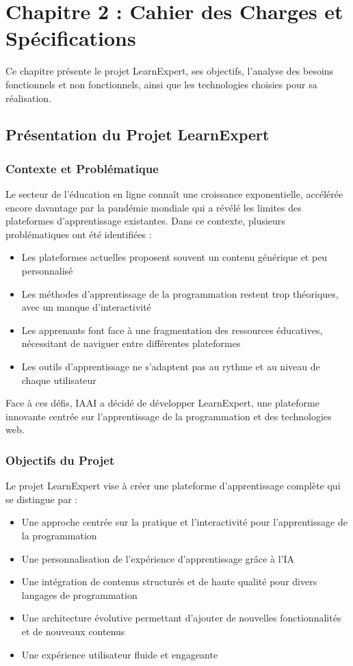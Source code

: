 \chapter{Chapitre 2 : Cahier des Charges et Spécifications}
\thispagestyle{fancy}
\newpage

Ce chapitre présente le projet LearnExpert, ses objectifs, l'analyse des besoins fonctionnels et non fonctionnels, ainsi que les technologies choisies pour sa réalisation.

\section{Présentation du Projet LearnExpert}

\subsection{Contexte et Problématique}
Le secteur de l'éducation en ligne connaît une croissance exponentielle, accélérée encore davantage par la pandémie mondiale qui a révélé les limites des plateformes d'apprentissage existantes. Dans ce contexte, plusieurs problématiques ont été identifiées :

\begin{itemize}
  \item Les plateformes actuelles proposent souvent un contenu générique et peu personnalisé
  \item Les méthodes d'apprentissage de la programmation restent trop théoriques, avec un manque d'interactivité
  \item Les apprenants font face à une fragmentation des ressources éducatives, nécessitant de naviguer entre différentes plateformes
  \item Les outils d'apprentissage ne s'adaptent pas au rythme et au niveau de chaque utilisateur
\end{itemize}

Face à ces défis, IAAI a décidé de développer LearnExpert, une plateforme innovante centrée sur l'apprentissage de la programmation et des technologies web.

\subsection{Objectifs du Projet}
Le projet LearnExpert vise à créer une plateforme d'apprentissage complète qui se distingue par :

\begin{itemize}
  \item Une approche centrée sur la pratique et l'interactivité pour l'apprentissage de la programmation
  \item Une personnalisation de l'expérience d'apprentissage grâce à l'IA
  \item Une intégration de contenus structurés et de haute qualité pour divers langages de programmation
  \item Une architecture évolutive permettant d'ajouter de nouvelles fonctionnalités et de nouveaux contenus
  \item Une expérience utilisateur fluide et engageante
\end{itemize}

